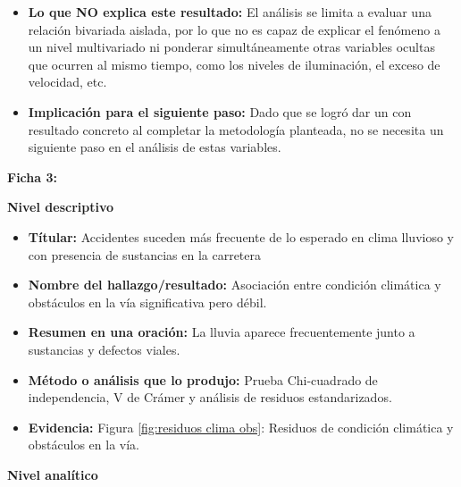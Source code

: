 \documentclass[12pt]{article}
\begin{document}
\begin{itemize}
	
	\item \textbf{Lo que NO explica este resultado:} El análisis se limita a evaluar
	una relación bivariada aislada, por lo que no es capaz de explicar el fenómeno 
	a un nivel multivariado ni ponderar simultáneamente otras variables ocultas que
	ocurren al mismo tiempo, como los niveles de iluminación, el exceso de velocidad, etc. 
	
	 \item \textbf{Implicación para el siguiente paso:} Dado que se logró dar un con 
  resultado concreto al completar la metodología planteada, no se necesita un 
  siguiente paso en el análisis de estas variables. \\
\end{itemize} 

\textbf{Ficha 3:}

\textbf{Nivel descriptivo}
\begin{itemize}
    \item \textbf{Títular:} Accidentes suceden más frecuente de lo esperado en clima
    lluvioso y con presencia de sustancias en la carretera
    
    \item \textbf{Nombre del hallazgo/resultado:} Asociación entre condición climática 
    y obstáculos en la vía significativa pero débil.
    
    \item \textbf{Resumen en una oración:} La lluvia aparece frecuentemente junto a 
    sustancias y defectos viales.
    
    \item \textbf{Método o análisis que lo produjo:} Prueba Chi-cuadrado de independencia,
    V de Crámer y análisis de residuos estandarizados.

    
    \item \textbf{Evidencia:} Figura \ref{fig:residuos clima obs}: Residuos de 
    condición climática y obstáculos en la vía. \\
    
\end{itemize}

\textbf{Nivel analítico}
\end{document}
